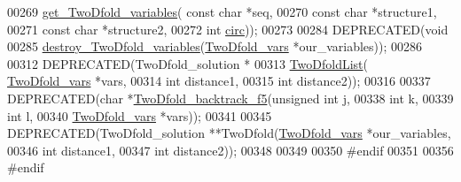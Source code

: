 \begin{DoxyCode}
00269 \hyperlink{group__kl__neighborhood__mfe_gac9284f132cf0eaa0a2f43590eda05488}{get\_TwoDfold\_variables}( \textcolor{keyword}{const} \textcolor{keywordtype}{char} *seq,
00270                         \textcolor{keyword}{const} \textcolor{keywordtype}{char} *structure1,
00271                         \textcolor{keyword}{const} \textcolor{keywordtype}{char} *structure2,
00272                         \textcolor{keywordtype}{int} \hyperlink{group__model__details_gaf9202a1a09f5828dc731e2d9a10fa111}{circ}));
00273 
00284 DEPRECATED(\textcolor{keywordtype}{void} 
00285 \hyperlink{group__kl__neighborhood__mfe_ga05bf4f31d216b1b160fd2d3d68e9b487}{destroy\_TwoDfold\_variables}(\hyperlink{group__kl__neighborhood__mfe_structTwoDfold__vars}{TwoDfold\_vars} *our\_variables));
00286 
00312 DEPRECATED(TwoDfold\_solution *
00313 \hyperlink{group__kl__neighborhood__mfe_ga7fc5e3e92fe97914ca4eccd33c01c2a7}{TwoDfoldList}( \hyperlink{group__kl__neighborhood__mfe_structTwoDfold__vars}{TwoDfold\_vars} *vars,
00314               \textcolor{keywordtype}{int} distance1,
00315               \textcolor{keywordtype}{int} distance2));
00316 
00337 DEPRECATED(\textcolor{keywordtype}{char} *\hyperlink{group__kl__neighborhood__mfe_gaf4dc05bf8fc1ea53acd7aeb798ba80c2}{TwoDfold\_backtrack\_f5}(\textcolor{keywordtype}{unsigned} \textcolor{keywordtype}{int} j,
00338                             \textcolor{keywordtype}{int} k,
00339                             \textcolor{keywordtype}{int} l,
00340                             \hyperlink{group__kl__neighborhood__mfe_structTwoDfold__vars}{TwoDfold\_vars} *vars));
00341 
00345 DEPRECATED(TwoDfold\_solution **TwoDfold(\hyperlink{group__kl__neighborhood__mfe_structTwoDfold__vars}{TwoDfold\_vars} *our\_variables,
00346                                         \textcolor{keywordtype}{int} distance1,
00347                                         \textcolor{keywordtype}{int} distance2));
00348 
00349 
00350 \textcolor{preprocessor}{#endif}
00351 
00356 \textcolor{preprocessor}{#endif}
\end{DoxyCode}
